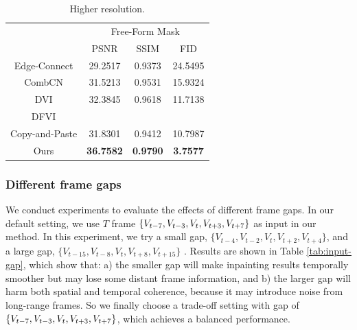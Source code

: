 \begin{table}[t]
	\caption{Higher resolution. }\smallskip
	\scriptsize
	\centering
	{
			\smallskip\begin{tabular}{c|c|c|c}
			\hline
			&\multicolumn{3}{c}{Free-Form Mask} \\
			\cline{2-4} 
			& PSNR & SSIM & FID\\
			
			\hline
			
		Edge-Connect \cite{nazeri2019edgeconnect} &29.2517 &0.9373 &  24.5495\\
	\hline
	CombCN \cite{wang2019video} & 31.5213 & 0.9531 & 15.9324 \\
	\hline
	
	
	DVI \cite{Kim_2019_CVPR1}&32.3845  &0.9618 & 11.7138 \\
	\hline
	
	DFVI \cite{Xu_2019_CVPR} & \\
	\hline
	
	Copy-and-Paste \cite{lee2019copy}&
	 31.8301 &  0.9412  & 10.7987
	\\
	
	\hline
	
	
	
	
	
	
	
	
	Ours &\textbf{36.7582} & \textbf{0.9790} &\textbf{3.7577}  \\
	\hline
		
			
		\end{tabular}
	}
	\label{tab:higherres_com}
\end{table}



{\color{blue}
	\subsubsection{Different frame gaps}
	
	 We conduct experiments to evaluate the effects of different frame gaps. In our default setting, we use $T$ frame $\{V_{t-7},V_{t-3},V_{t},V_{t+3},V_{t+7}\}$ as input in our method. In this experiment, we try a small gap, $\{V_{t-4},V_{t-2},V_{t},V_{t+2},V_{t+4}\}$, and a large gap, $\{V_{t-15},V_{t-8},V_{t},V_{t+8},V_{t+15}\}$ . Results are shown in Table \ref{tab:input-gap}, which show that: a) the smaller gap will make inpainting results temporally smoother but may lose some distant frame information, and b) the larger gap will harm both spatial and temporal coherence, because it may introduce noise from long-range frames. So we finally choose a trade-off setting with gap of $\{V_{t-7},V_{t-3},V_{t},V_{t+3},V_{t+7}\}$, which achieves a balanced performance.

}


